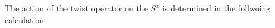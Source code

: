 \documentclass[reprint,prb,superscriptaddress]{revtex4-1}
\begin{document}
The action of the twist operator on the $S^x$ is determined in the follwoing calculation
\end{document}
